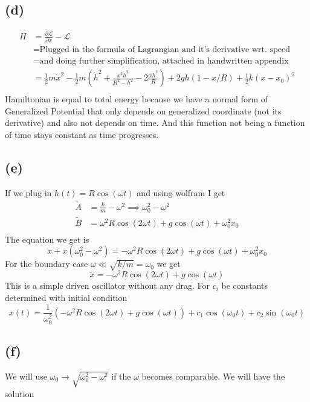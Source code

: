\documentclass[letter, 10pts]{article}
\begin{document}
\subsection*{(d)} 
\begin{align*}
	H &= \frac{\partial \mathcal L}{\partial \dot x} - \mathcal L \\ 
	&=  \text{Plugged in the formula of Lagrangian and it's derivative wrt. speed} \\ 
	&=  \text{and doing further simplification, attached in handwritten appendix}\\
	&= \frac{1}{2} m \dot x ^2 - 
	\frac{1}{2} m 
	\left(
\dot h ^2 + \frac{x^2 \dot h ^2}{R^2 - h^2} - 2 \frac{x \dot h^2 }{R}
	\right) + 2 gh \left( 1 - x / R\right) + \frac{1}{2} k (x - x_0)^2\\
\end{align*}
Hamiltonian is equal to total energy because we have a normal form of Generalized Potential that only depends on generalized coordinate (not its derivative) and also not depends on time. And this function not being a function of time stays constant as time progresses. 


\subsection*{(e)}
If we plug in $h(t) = R \cos( \omega t)$ and using wolfram I get
\begin{align*}
	\tilde A &=  \frac{k}{m} - \omega^2 \implies \omega_0^2 - \omega^2 \\
	\tilde B &= \omega^2 R \cos ( 2 \omega t) + g \cos( \omega t) + \omega_0^2 x_0 \\
\end{align*}
The equation we get is 
\[
\ddot{x}  +
x (\omega_0^2 - \omega ^2) = 
- \omega^2 R \cos ( 2 \omega t) + 
g \cos( \omega t) + \omega_0^2 x_0
\] 
For the boundary case $\omega \ll \sqrt{k / m}  = \omega_0 $ we get 
\[
\ddot{x}  = - \omega^2 R \cos ( 2 \omega t) + g \cos(\omega t) 
\] 
This is a simple driven oscillator without any drag. For $c_i$ be constants determined with initial condition 
\[
x(t) = \frac{1}{\omega_0^2} 
\left(
- \omega^2 R \cos ( 2 \omega t) + 
g \cos( \omega t)
\right) + 
c_1 \cos (\omega_0 t) + 
c_2 \sin(\omega_0 t) 
\]


\subsection*{(f)}
We will use $\omega_0 \to  \sqrt{\omega_0 ^2 - \omega^2} $ if the $\omega$ becomes comparable. We will have the solution
\end{document}
